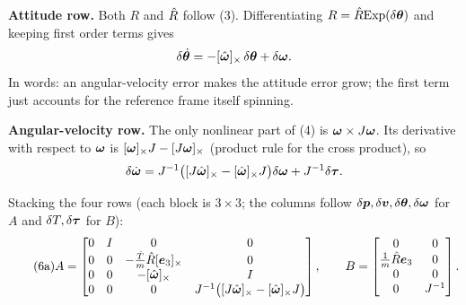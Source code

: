 \textbf{Attitude row.} Both $R$ and $\hat{R}$ follow (3). Differentiating $R=\hat{R}\mathrm{Exp}(\delta\bm{\theta})$ and keeping first order
terms gives
\[
\delta\dot{\bm{\theta}}=-[\hat{\bm\omega}]_{\times}\,\delta\bm{\theta}+\delta\bm{\omega} .
\]
In words: an angular-velocity error makes the attitude error grow; the first term just accounts for the reference
frame itself spinning.

\textbf{Angular-velocity row.} The only nonlinear part of (4) is $\bm{\omega}\times J\bm{\omega}$. Its derivative with respect to $\bm{\omega}$
is $[\bm{\omega}]_{\times}J-[J\bm{\omega}]_{\times}$ (product rule for the cross product), so
\[
\delta\dot{\bm{\omega}}=J^{-1}\big([J\hat{\bm\omega}]_{\times}-[\hat{\bm\omega}]_{\times}J\big)\delta\bm{\omega}+J^{-1}\delta\bm{\tau} .
\]

Stacking the four rows (each block is $3\times3$; the columns follow $\delta\bm{p},\delta\bm{v},\delta\bm{\theta},\delta\bm{\omega}$ for $A$
and $\delta T,\delta\bm{\tau}$ for $B$):
\begin{equation}
\label{eq:AB}\tag{6a}
A=\begin{bmatrix}
0&I&0&0\\
0&0&-\frac{\hat T}{m}\hat{R}[\bm{e}_3]_{\times}&0\\
0&0&-[\hat{\bm\omega}]_{\times}&I\\
0&0&0&J^{-1}\big([J\hat{\bm\omega}]_{\times}-[\hat{\bm\omega}]_{\times}J\big)
\end{bmatrix},\qquad
B=\begin{bmatrix}0&0\\ \frac1m\hat{R}\bm{e}_3&0\\ 0&0\\ 0&J^{-1}\end{bmatrix}.
\end{equation}

